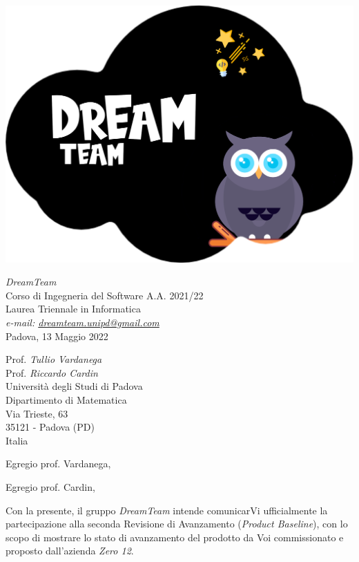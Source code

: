 \documentclass[a4paper]{scrlttr2}
\begin{document}
\includegraphics[scale=0.05]{DreamTeam.png}

\begin{flushright}
\textit{DreamTeam} \\
Corso di Ingegneria del Software A.A. 2021/22 \\
Laurea Triennale in Informatica \\
\textsl{e-mail: \href{mailto:dreamteam.unipd@gmail.com}{dreamteam.unipd@gmail.com}} \\
Padova, 13 Maggio 2022
\end{flushright}

\begin{flushleft}
{Prof. \textit{Tullio Vardanega} \\ Prof. \textit{Riccardo Cardin} \\
Università degli Studi di Padova \\
Dipartimento di Matematica \\
Via Trieste, 63 \\
35121 - Padova (PD) \\ 
Italia}
\end{flushleft}

\vspace*{15px}

Egregio prof. Vardanega,  

Egregio prof. Cardin, 

\vspace*{10px}

Con la presente, il gruppo \textit{DreamTeam} intende comunicarVi ufficialmente la partecipazione alla seconda Revisione di Avanzamento (\textit{Product Baseline}), con lo scopo di mostrare lo stato di avanzamento del prodotto da Voi commissionato e proposto dall'azienda \textit{Zero 12}.
\end{document}

